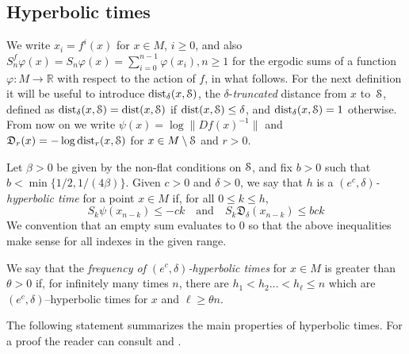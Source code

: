 \documentclass[reqno,12pt,a4paper]{amsart}
\theoremstyle{plain}
\theoremstyle{definition}
\begin{document}
\subsection{Hyperbolic times}
\label{sec:hyperb-times}

We write $x_i=f^i(x)$ for $x\in M$, $i\ge0$, and also
$S_n^f\varphi(x)=S_n\varphi(x)=\sum_{i=0}^{n-1}
\varphi(x_i), n\ge1$ for the ergodic sums of a function
$\varphi:M\to{{\mathbb R}}$ with respect to the action of $f$, in what
follows.  For the next definition it will be useful to
introduce \( {\operatorname{dist}}_{\delta}(x,{\EuScript{S}}) \), the \( \delta
\)-\emph{truncated} distance from \( x \) to~${\EuScript{S}}$, defined
as \( {\operatorname{dist}}_{\delta}(x,{\EuScript{S}}) = {\operatorname{dist}}(x,{\EuScript{S}}) \) if \(
{\operatorname{dist}}(x,{\EuScript{S}}) \leq \delta\), and \( {\operatorname{dist}}_{\delta}(x,{\EuScript{S}}) =1
\) otherwise.  From now on we write
$\psi(x)=\log\|Df(x)^{-1}\|$ and ${{\mathfrak D}}_r(x)=-\log
{\operatorname{dist}}_r(x,{\EuScript{S}})$ for $x\in M\setminus{\EuScript{S}}$ and $r>0$.

Let $\beta>0$ be given by the non-flat conditions on ${\EuScript{S}}$,
and fix $b>0$ such that $b < \min\{1/2,1/(4\beta)\}$.  Given
$c>0$ and $\delta>0$, we say that $h$ is a {\em
  $(e^c,\delta)$-hyperbolic time}
for a point $x\in M$ if, for all $0\le k \le h$,
 \begin{equation}\label{d.ht}
S_k\psi(x_{n-k})\le -ck
\quad\text{and}\quad
S_k{{\mathfrak D}}_\delta(x_{n-k})\le b c k
 \end{equation}
 We convention that an empty sum evaluates to $0$ so
 that the above inequalities make sense for all indexes in
 the given range.

 We say that the {\em frequency of
   $(e^c,\delta)$-hyperbolic times} for $x\in M$ is
 greater than $\theta>0$ if, for infinitely many times $n$,
 there are $h_1<h_2\dots <h_\ell\le n$ which are
 $(e^c,\delta)$--hyperbolic times for $x$ and $\ell
 \ge\theta n$.

 The following statement summarizes the main properties of
 hyperbolic times. For a proof the reader can consult
 \cite[Lemma 5.2]{ABV00} and \cite[Corollary 5.3]{ABV00}.
\end{document}
